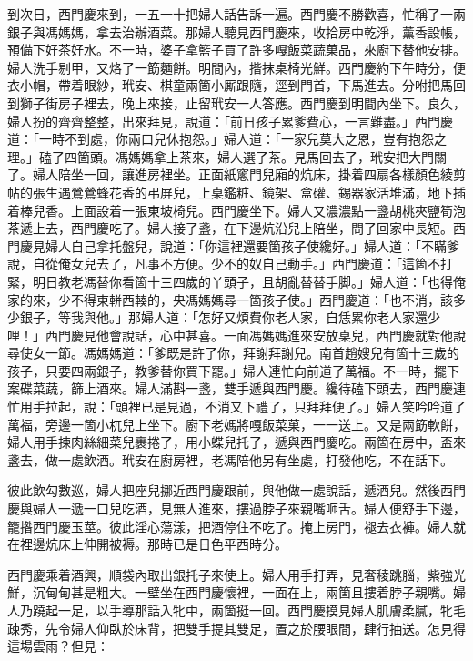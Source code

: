 到次日，西門慶來到，一五一十把婦人話告訴一遍。西門慶不勝歡喜，忙稱了一兩銀子與馮媽媽，拿去治辦酒菜。那婦人聽見西門慶來，收拾房中乾淨，薰香設帳，預備下好茶好水。不一時，婆子拿籃子買了許多嘎飯菜蔬菓品，來廚下替他安排。婦人洗手剔甲，又烙了一筯麵餅。明間內，揩抹桌椅光鮮。西門慶約下午時分，便衣小帽，帶着眼紗，玳安、棋童兩箇小厮跟隨，逕到門首，下馬進去。分咐把馬回到獅子街房子裡去，晚上來接，止留玳安一人答應。西門慶到明間內坐下。良久，婦人扮的齊齊整整，出來拜見，說道：「前日孩子累爹費心，一言難盡。」西門慶道：「一時不到處，你兩口兒休抱怨。」婦人道：「一家兒莫大之恩，豈有抱怨之理。」磕了四箇頭。馮媽媽拿上茶來，婦人選了茶。見馬回去了，玳安把大門關了。{}婦人陪坐一回，讓進房裡坐。正面紙窻門兒廂的炕床，掛着四扇各樣顏色綾剪帖的張生遇鶯鶯蜂花香的弔屏兒，上桌鑑粧、鏡架、盒礶、錫器家活堆滿，地下插着棒兒香。{}上面設着一張東坡椅兒。{}西門慶坐下。婦人又濃濃點一盞胡桃夾鹽筍泡茶遞上去，西門慶吃了。婦人接了盞，在下邊炕沿兒上陪坐，問了回家中長短。西門慶見婦人自己拿托盤兒，說道：「你這裡還要箇孩子使纔好。」婦人道：「不瞞爹說，自從俺女兒去了，凡事不方便。少不的奴自己動手。」西門慶道：「這箇不打緊，明日教老馮替你看箇十三四歲的丫頭子，且胡亂替替手脚。」婦人道：「也得俺家的來，少不得東軿西輳的，{}央馮媽媽尋一箇孩子使。」西門慶道：「也不消，該多少銀子，等我與他。」那婦人道：「怎好又煩費你老人家，自恁累你老人家還少哩！」西門慶見他會說話，心中甚喜。一面馮媽媽進來安放桌兒，西門慶就對他說尋使女一節。馮媽媽道：「爹既是許了你，拜謝拜謝兒。南首趙嫂兒有箇十三歲的孩子，只要四兩銀子，教爹替你買下罷。」婦人連忙向前道了萬福。不一時，擺下案碟菜蔬，篩上酒來。婦人滿斟一盞，雙手遞與西門慶。纔待磕下頭去，西門慶連忙用手拉起，說：「頭裡已是見過，不消又下禮了，只拜拜便了。」婦人笑吟吟道了萬福，旁邊一箇小杌兒上坐下。廚下老媽將嘎飯菜菓，一一送上。又是兩筯軟餅，婦人用手揀肉絲細菜兒裹捲了，用小蝶兒托了，遞與西門慶吃。兩箇在房中，盃來盞去，做一處飲酒。玳安在廚房裡，老馮陪他另有坐處，打發他吃，不在話下。

彼此飲勾數巡，婦人把座兒挪近西門慶跟前，{}與他做一處說話，遞酒兒。然後西門慶與婦人一遞一口兒吃酒，見無人進來，摟過脖子來親嘴咂舌。婦人便舒手下邊，籠揝西門慶玉莖。彼此淫心蕩漾，把酒停住不吃了。掩上房門，褪去衣褲。婦人就在裡邊炕床上伸開被褥。那時已是日色平西時分。

西門慶乘着酒興，順袋內取出銀托子來使上。婦人用手打弄，見奢稜跳腦，紫強光鮮，沉甸甸甚是粗大。一壁坐在西門慶懷裡，一面在上，兩箇且摟着脖子親嘴。婦人乃蹺起一足，以手導那話入牝中，兩箇挺一回。西門慶摸見婦人肌膚柔膩，牝毛疎秀，先令婦人仰臥於床背，把雙手提其雙足，置之於腰眼間，肆行抽送。怎見得這場雲雨？但見：

